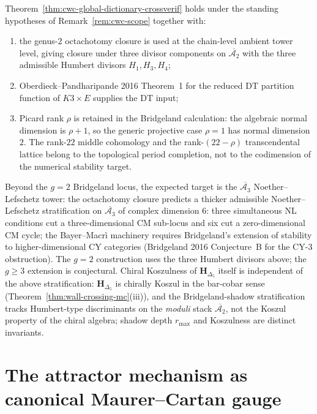 \begin{remark}
\label{rem:cwc-scope-crossverif}
Theorem~\ref{thm:cwc-global-dictionary-crossverif} holds under the
standing hypotheses of
Remark~\ref{rem:cwc-scope} together with:
\begin{enumerate}[label=\textup{(\alph*)}]
\item the genus-$2$ octachotomy closure is used at the chain-level
 ambient tower level, giving closure under three divisor components on
 $\overline{\mathcal A_2}$ with the
 three admissible Humbert divisors $H_1,H_3,H_4$;
\item Oberdieck--Pandharipande 2016 Theorem~1 for the reduced DT
 partition function of $K3\times E$ supplies the DT input;
\item Picard rank $\rho$ is retained in the Bridgeland calculation:
 the algebraic normal dimension is $\rho+1$, so the generic projective
 case $\rho=1$ has normal dimension $2$. The rank-$22$ middle
 cohomology and the rank-$(22-\rho)$ transcendental lattice belong to
 the topological period completion, not to the codimension of the
 numerical stability target.
\end{enumerate}
Beyond the $g=2$ Bridgeland locus, the expected target is the
$\overline{\mathcal A_3}$ Noether--Lefschetz tower: the octachotomy
closure predicts a thicker admissible Noether--Lefschetz
stratification on $\overline{\mathcal A_3}$ of complex dimension $6$:
three simultaneous NL conditions cut a three-dimensional CM
sub-locus and six cut a zero-dimensional CM cycle; the
Bayer--Macr\`i machinery requires Bridgeland's extension of stability
to higher-dimensional CY categories (Bridgeland 2016 Conjecture~B
for the CY-$3$ obstruction). The $g=2$ construction uses the three
Humbert divisors above; the $g\ge 3$ extension is conjectural. Chiral
Koszulness of
$\mathbf{H}_{\Delta_5}$ itself is independent of the above
stratification: $\mathbf{H}_{\Delta_5}$ is chirally Koszul in the
bar-cobar sense (Theorem~\ref{thm:wall-crossing-mc}(iii)), and the
Bridgeland-shadow stratification tracks Humbert-type discriminants
on the \emph{moduli} stack $\overline{\mathcal A_2}$, not the
Koszul property of the chiral algebra; shadow depth $r_{\max}$ and
Koszulness are distinct invariants.
\end{remark}

\section{The attractor mechanism as canonical Maurer--Cartan gauge}
\label{sec:phys-wc-attractor}


